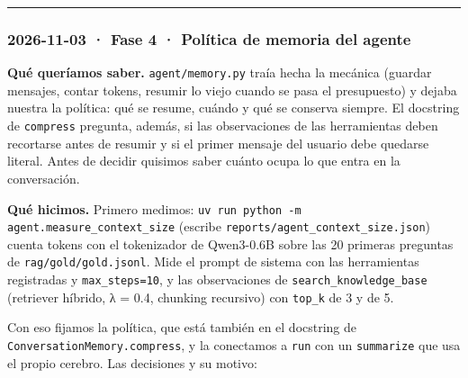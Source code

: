 \begin{center}\rule{0.5\linewidth}{0.5pt}\end{center}

\subsubsection{2026-11-03 · Fase 4 · Política de memoria del agente}

\textbf{Qué queríamos saber.} \texttt{agent/\allowbreak{}memory.py} traía hecha la mecánica (guardar mensajes, contar tokens,
resumir lo viejo cuando se pasa el presupuesto) y dejaba nuestra la política: qué se resume, cuándo y
qué se conserva siempre. El docstring de \texttt{compress} pregunta, además, si las observaciones de las
herramientas deben recortarse antes de resumir y si el primer mensaje del usuario debe quedarse
literal. Antes de decidir quisimos saber cuánto ocupa lo que entra en la conversación.

\textbf{Qué hicimos.} Primero medimos: \texttt{uv run python -m agent.measure\_\allowbreak{}context\_\allowbreak{}size} (escribe
\texttt{reports/\allowbreak{}agent\_\allowbreak{}context\_\allowbreak{}size.json}) cuenta tokens con el tokenizador de Qwen3-0.6B sobre las 20
primeras preguntas de \texttt{rag/\allowbreak{}gold/\allowbreak{}gold.jsonl}. Mide el prompt de sistema con las herramientas
registradas y \texttt{max\_\allowbreak{}steps=\allowbreak{}10}, y las observaciones de \texttt{search\_\allowbreak{}knowledge\_\allowbreak{}base} (retriever híbrido,
λ = 0.4, chunking recursivo) con \texttt{top\_\allowbreak{}k} de 3 y de 5.

Con eso fijamos la política, que está también en el docstring de \texttt{ConversationMemory.compress}, y la
conectamos a \texttt{run} con un \texttt{summarize} que usa el propio cerebro. Las decisiones y su motivo:

